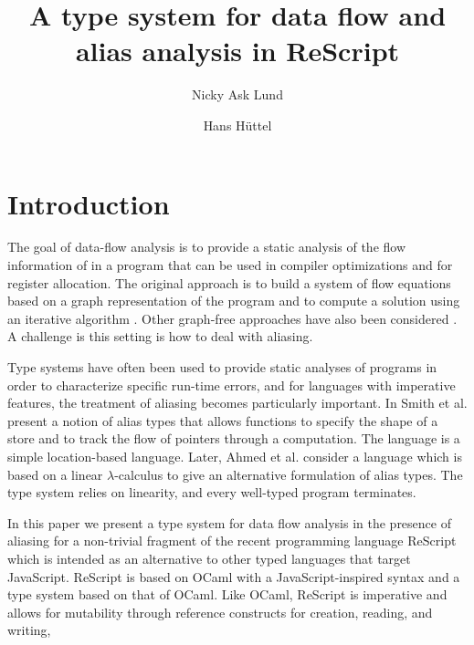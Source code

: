 \documentclass{llncs}
\begin{document}
\title{A type system for data flow and alias analysis in ReScript}

\author{Nicky Ask Lund  \and Hans Hüttel } 

\maketitle





\section{Introduction}

The goal of data-flow analysis is to provide a static analysis of the
flow information of in a program that can be used in compiler
optimizations and for register allocation. The original approach is to
build a system of flow equations based on a graph representation of
the program and to compute a solution using an iterative algorithm
\cite{KildallGaryA1973Auat,RyderBarbara1988Idaa}. Other graph-free
approaches have also been considered
\cite{HorspoolR.Niegel2002AGAt}. A challenge is this setting is how to
deal with aliasing.

Type systems have often been used to provide static analyses of
programs in order to characterize specific run-time errors, and for
languages with imperative features, the treatment of aliasing becomes
particularly important. In \cite{10.1007/3-540-46425-5_24} Smith et
al. present a notion of alias types that allows functions to specify
the shape of a store and to track the flow of pointers through a
computation. The language is a simple location-based language. Later,
Ahmed et al. \cite{DBLP:conf/tlca/MorrisettAF05} consider a language
which is based on a linear $\lambda$-calculus to give an alternative
formulation of alias types. The type system relies on linearity, and
every well-typed program terminates.

In this paper we present a type system for data flow analysis in the
presence of aliasing for a non-trivial fragment of the recent
programming language ReScript which is intended as an alternative to
other typed languages that target JavaScript. ReScript is based on
OCaml with a JavaScript-inspired syntax and a type system based on
that of OCaml\cite{rescript_rebrand}. Like OCaml, ReScript is
imperative and allows for mutability through reference constructs for
creation, reading, and writing,
\end{document}
